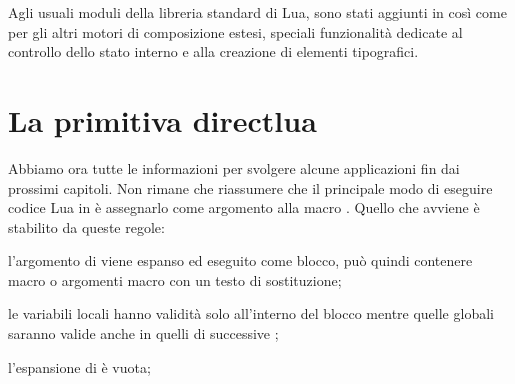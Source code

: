 Agli usuali moduli della libreria standard di Lua, sono stati aggiunti in
\LuaTeX{} così come per gli altri motori di composizione estesi, speciali
funzionalità dedicate al controllo dello stato interno e alla creazione di
elementi tipografici.


\section{La primitiva directlua}

Abbiamo ora tutte le informazioni per svolgere alcune applicazioni fin dai
prossimi capitoli. Non rimane che riassumere che il principale modo di eseguire
codice Lua in \LuaTeX{} è assegnarlo come argomento alla macro .
Quello che avviene è stabilito da queste regole:
\begin{compactenumerate}
\item l'argomento di  viene espanso ed eseguito come blocco, può
quindi contenere macro o argomenti macro con un testo di sostituzione;

\item le variabili locali hanno validità solo all'interno del blocco mentre
quelle globali saranno valide anche in quelli di successive ;

\item l'espansione di  è vuota;
\end{compactenumerate}


